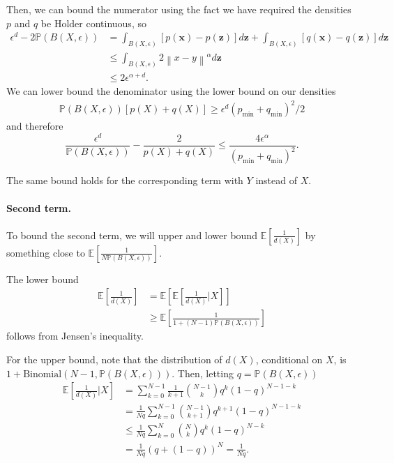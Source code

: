 \documentclass{article}
\newcommand{\Expect}[1]{\mathbb{E}\left[ #1 \right]}
\newcommand{\Prob}[1]{\mathbb{P}\left( #1 \right)}
\newcommand{\norm}[1]{\left\lVert#1\right\rVert}
\newcommand{\x}{\textbf{x}}
\newcommand{\z}{\textbf{z}}
\theoremstyle{alden}
\theoremstyle{definition}
\theoremstyle{remark}
\begin{document}
Then, we can bound the numerator using the fact we have required the densities $p$ and $q$ be Holder continuous, so
\begin{align*}
[p(X) + q(X)] \epsilon^d - 2 \Prob{B(X,\epsilon)} & = \int_{B(X,\epsilon)} [p(\x) - p(\z)] d\z + \int_{B(X,\epsilon)} [q(\x) - q(\z)] d\z \\
& \leq \int_{B(X,\epsilon)} 2 \norm{x - y}^{\alpha} d\z\\
& \leq 2 \epsilon^{\alpha + d}.
\end{align*}
We can lower bound the denominator using the lower bound on our densities
\begin{align*}
\Prob{B(X,\epsilon)}[p(X) + q(X)] \geq \epsilon^d(p_{\min} + q_{\min})^2 / 2
\end{align*}
and therefore
\begin{equation*}
\frac{\epsilon^d }{\Prob{B(X,\epsilon)} }  - \frac{2}{p(X) + q(X)} \leq \frac{4 \epsilon^{\alpha}}{(p_{\min} + q_{\min})^2}.
\end{equation*}

The same bound holds for the corresponding term with $Y$ instead of $X$.

\paragraph{Second term.}

To bound the second term, we will upper and lower bound $\Expect{ \frac{1}{d(X)} }$ by something close to $\Expect{ \frac{1}{N\Prob{B(X,\epsilon)}} }$.

The lower bound
\begin{align*}
\Expect{ \frac{1}{d(X)} } & = \Expect{ \Expect{\frac{1}{d(X)} \bigg| X} } \\
& \geq \Expect{ \frac{1}{1 + (N - 1)\Prob{B(X,\epsilon)}} } 
\end{align*}
follows from Jensen's inequality.

For the upper bound, note that the distribution of $d(X)$, conditional on $X$, is $1 + \text{Binomial}(N - 1,\Prob{B(X,\epsilon)})$. Then, letting $q = \Prob{B(X,\epsilon)}$
\begin{align*}
\Expect{\frac{1}{d(X)} \bigg| X} & = \sum_{k = 0}^{N - 1} \frac{1}{k + 1} {N - 1 \choose k} q^k (1 - q)^{N - 1 - k} \\
& = \frac{1}{Nq} \sum_{k = 0}^{N - 1}  {N - 1 \choose k + 1} q^{k + 1} (1 - q)^{N - 1 - k} \\
& \leq \frac{1}{Nq} \sum_{k = 0}^{N} {N \choose k } q^k (1 - q)^{N - k} \\
& = \frac{1}{Nq} \left(q + (1 - q)\right)^N = \frac{1}{Nq}.
\end{align*}
\end{document}
